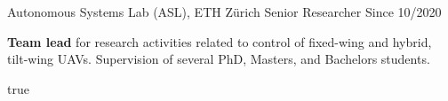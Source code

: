 \label{sec:exp}


\begin{cventries}

\cvexpentry
  	{Autonomous Systems Lab (ASL), ETH Z\"{u}rich} %
  	{Senior Researcher} %
    {} %
    {Since 10/2020} %
    {
      \begin{cvitems} %
      	\item \textbf{Team lead} for research activities related to control of fixed-wing and hybrid, tilt-wing UAVs. Supervision of several PhD, Masters, and Bachelors students.
      \end{cvitems}
    } %
    {} %
    {true}
    {}


\end{cventries}
